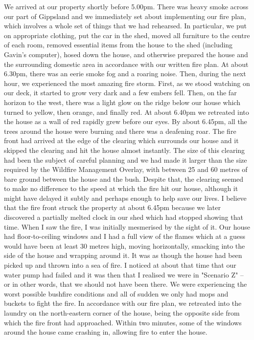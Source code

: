 \documentclass[a4paper]{article}
\begin{document}
        We arrived at our property shortly before 5.00pm. There was heavy smoke across our part of Gippsland and we immediately set about implementing our fire plan, which involves a whole set of things that we had rehearsed. In particular, we put on appropriate clothing, put the car in the shed, moved all furniture to the centre of each room, removed essential items from the house to the shed (including Gavin's computer), hosed down the house, and otherwise prepared the house and the surrounding domestic area in accordance with our written fire plan.
        At about 6.30pm, there was an eerie smoke fog and a roaring noise. Then, during the next hour, we experienced the most amazing fire storm. First, as we stood watching on our deck, it started to grow very dark and a few embers fell. Then, on the far horizon to the west, there was a light glow on the ridge below our house which turned to yellow, then orange, and finally red. At about 6.40pm we retreated into the house as a wall of red rapidly grew before our eyes. By about 6.45pm, all the trees around the house were burning and there was a deafening roar. The fire front had arrived at the edge of the clearing which surrounds our house and it skipped the clearing and hit the house almost instantly. The size of this clearing had been the subject of careful planning and we had made it larger than the size required by the Wildfire Management Overlay, with between 25 and 60 metres of bare ground between the house and the bush. Despite that, the clearing seemed to make no difference to the speed at which the fire hit our house, although it might have delayed it subtly and perhaps enough to help save our lives.
        I believe that the fire front struck the property at about 6.45pm because we later discovered a partially melted clock in our shed which had stopped showing that time. When I saw the fire, I was initially mesmerised by the sight of it. Our house had floor-to-ceiling windows and I had a full view of the flames which at a guess would have been at least 30 metres high, moving horizontally, smacking into the side of the house and wrapping around it. It was as though the house had been picked up and thrown into a sea of fire.
        I noticed at about that time that our water pump had failed and it was then that I realised we were in "Scenario Z" – or in other words, that we should not have been there. We were experiencing the worst possible bushfire conditions and all of sudden we only had mops and buckets to fight the fire. In accordance with our fire plan, we retreated into the laundry on the north-eastern corner of the house, being the opposite side from which the fire front had approached. Within two minutes, some of the windows around the house came crashing in, allowing fire to enter the house.
\end{document}
